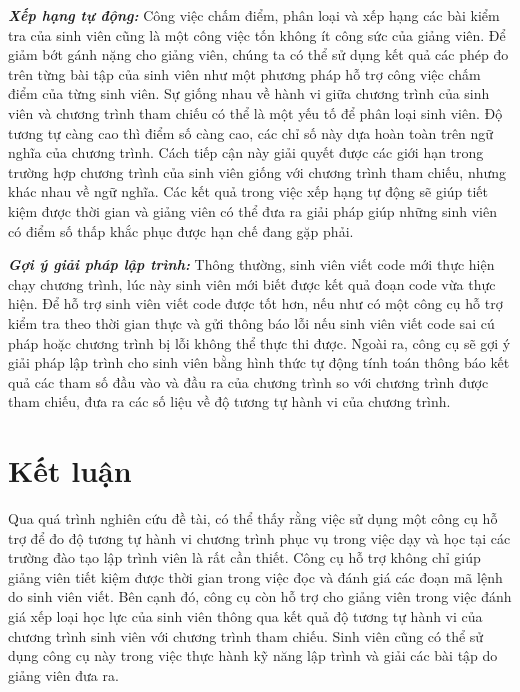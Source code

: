 \textit{\textbf{Xếp hạng tự động:}} Công việc chấm điểm, phân loại và
xếp hạng các bài kiểm tra của sinh viên cũng là một công việc tốn
không ít công sức của giảng viên. Để giảm bớt gánh nặng cho giảng
viên, chúng ta có thể sử dụng kết quả các phép đo trên từng bài tập
của sinh viên như một phương pháp hỗ trợ công việc chấm điểm của từng
sinh viên. Sự giống nhau về hành vi giữa chương trình của sinh viên và
chương trình tham chiếu có thể là một yếu tố để phân loại sinh
viên. Độ tương tự càng cao thì điểm số càng cao, các chỉ số này dựa
hoàn toàn trên ngữ nghĩa của chương trình. Cách tiếp cận này giải
quyết được các giới hạn trong trường hợp chương trình của sinh viên
giống với chương trình tham chiếu, nhưng khác nhau về ngữ nghĩa. Các
kết quả trong việc xếp hạng tự động sẽ giúp tiết kiệm được thời gian
và giảng viên có thể đưa ra giải pháp giúp những sinh viên có điểm số
thấp khắc phục được hạn chế đang gặp phải.

\textit{\textbf{Gợi ý giải pháp lập trình:}} Thông thường, sinh viên
viết code mới thực hiện chạy chương trình, lúc này sinh viên
mới biết được kết quả đoạn code vừa thực hiện. Để hỗ trợ sinh viên
viết code được tốt hơn, nếu như có một công cụ hỗ trợ kiểm tra theo
thời gian thực và gửi thông báo lỗi nếu sinh viên viết code sai cú
pháp hoặc chương trình bị lỗi không thể thực thi được. Ngoài ra, công
cụ sẽ gợi ý giải pháp lập trình cho sinh viên bằng hình thức tự động
tính toán thông báo kết quả các tham số đầu vào và đầu ra của chương
trình so với chương trình được tham chiếu, đưa ra các số liệu về độ
tương tự hành vi của chương trình.

\section{Kết luận}
Qua quá trình nghiên cứu đề tài, có thể thấy rằng việc sử dụng một 
công cụ hỗ trợ để đo độ tương tự hành vi chương trình phục vụ trong 
việc dạy và học tại các trường đào tạo lập trình viên là rất cần 
thiết. Công cụ hỗ trợ không chỉ giúp giảng viên tiết kiệm được thời 
gian trong việc đọc và đánh giá các đoạn mã lệnh do sinh viên viết. 
Bên cạnh đó, công cụ còn hỗ trợ cho giảng viên trong việc đánh giá 
xếp loại học lực của sinh viên thông qua kết quả độ tương tự hành vi 
của chương trình sinh viên với chương trình tham chiếu. Sinh viên cũng  
có thể sử dụng công cụ này trong việc thực hành kỹ năng lập trình 
và giải các bài tập do giảng viên đưa ra. 

